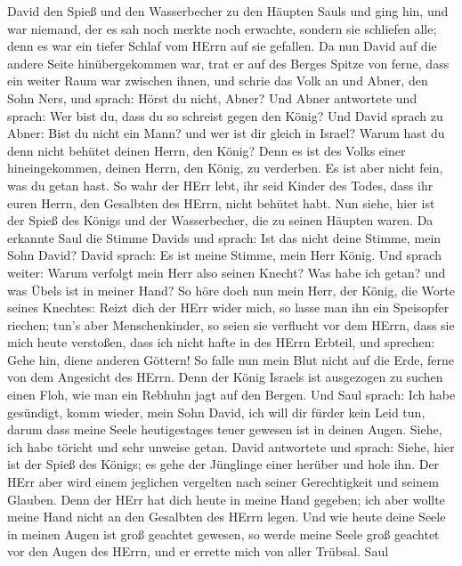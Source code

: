 David den Spieß und den Wasserbecher zu den Häupten Sauls und ging hin,
und war niemand, der es sah noch merkte noch erwachte, sondern sie
schliefen alle; denn es war ein tiefer Schlaf vom HErrn auf sie
gefallen.  Da nun David auf die andere Seite
hinübergekommen war, trat er auf des Berges Spitze von ferne, dass ein
weiter Raum war zwischen ihnen,  und schrie das Volk an und
Abner, den Sohn Ners, und sprach: Hörst du nicht, Abner? Und Abner
antwortete und sprach: Wer bist du, dass du so schreist gegen den König?
 Und David sprach zu Abner: Bist du nicht ein Mann? und wer
ist dir gleich in Israel? Warum hast du denn nicht behütet deinen Herrn,
den König? Denn es ist des Volks einer hineingekommen, deinen Herrn, den
König, zu verderben.  Es ist aber nicht fein, was du getan
hast. So wahr der HErr lebt, ihr seid Kinder des Todes, dass ihr euren
Herrn, den Gesalbten des HErrn, nicht behütet habt. Nun siehe, hier ist
der Spieß des Königs und der Wasserbecher, die zu seinen Häupten waren.
 Da erkannte Saul die Stimme Davids und sprach: Ist das
nicht deine Stimme, mein Sohn David? David sprach: Es ist meine Stimme,
mein Herr König.  Und sprach weiter: Warum verfolgt mein
Herr also seinen Knecht? Was habe ich getan? und was Übels ist in meiner
Hand?  So höre doch nun mein Herr, der König, die Worte
seines Knechtes: Reizt dich der HErr wider mich, so lasse man ihn ein
Speisopfer riechen; tun's aber Menschenkinder, so seien sie verflucht
vor dem HErrn, dass sie mich heute verstoßen, dass ich nicht hafte in
des HErrn Erbteil, und sprechen: Gehe hin, diene anderen Göttern!
 So falle nun mein Blut nicht auf die Erde, ferne von dem
Angesicht des HErrn. Denn der König Israels ist ausgezogen zu suchen
einen Floh, wie man ein Rebhuhn jagt auf den Bergen.  Und
Saul sprach: Ich habe gesündigt, komm wieder, mein Sohn David, ich will
dir fürder kein Leid tun, darum dass meine Seele heutigestages teuer
gewesen ist in deinen Augen. Siehe, ich habe töricht und sehr unweise
getan.  David antwortete und sprach: Siehe, hier ist der
Spieß des Königs; es gehe der Jünglinge einer herüber und hole ihn.
 Der HErr aber wird einem jeglichen vergelten nach seiner
Gerechtigkeit und seinem Glauben. Denn der HErr hat dich heute in meine
Hand gegeben; ich aber wollte meine Hand nicht an den Gesalbten des
HErrn legen.  Und wie heute deine Seele in meinen Augen ist
groß geachtet gewesen, so werde meine Seele groß geachtet vor den Augen
des HErrn, und er errette mich von aller Trübsal.  Saul
